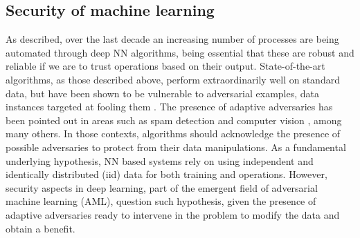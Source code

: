 


\subsection{Security of machine learning}


As described, over the last decade
an increasing number of processes are being automated through 
deep NN algorithms, being 
essential that these are robust and reliable
if we are to
trust operations based on their output. State-of-the-art
algorithms, as those described above, perform extraordinarily well on standard data,  but have been
shown to be vulnerable to adversarial examples, data instances targeted at
fooling them \cite{goodfellow2014explaining}.
The presence of adaptive adversaries has
been pointed out in areas such as spam detection \cite{zeager2017adversarial}
and computer vision \cite{goodfellow2014explaining}, among many others. 
In those contexts, algorithms should acknowledge the presence of possible adversaries
to protect from their data manipulations.
As a fundamental underlying hypothesis, NN
based systems rely on using 
independent and identically distributed (iid) data for both training and operations. However, security aspects in deep
learning, part of the emergent field of
adversarial machine learning (AML),
question such hypothesis, given the
presence of adaptive adversaries ready to  intervene in the problem 
to modify the data and obtain a benefit. 

